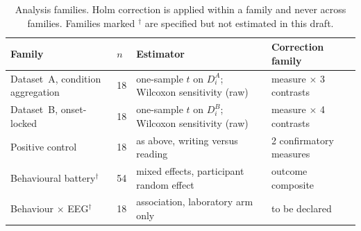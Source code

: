 \documentclass[english]{article}
\begin{document}
\begin{table}[H]
\centering
\footnotesize
\caption{Analysis families. Holm correction is applied within a family and never across families.
Families marked \(^{\dagger}\) are specified but not estimated in this draft.}
\label{tab:analysis-families}
\setlength{\tabcolsep}{5pt}
\begin{tabular}{@{}llll@{}}
\toprule
Family & \(n\) & Estimator & Correction family \\
\midrule
Dataset~A, condition aggregation & 18 & one-sample \(t\) on \(D^{A}_{i}\); Wilcoxon sensitivity (raw) & measure \(\times\) 3 contrasts \\
Dataset~B, onset-locked & 18 & one-sample \(t\) on \(D^{B}_{i}\); Wilcoxon sensitivity (raw) & measure \(\times\) 4 contrasts \\
Positive control & 18 & as above, writing versus reading & 2 confirmatory measures \\
Behavioural battery\(^{\dagger}\) & 54 & mixed effects, participant random effect & outcome composite \\
Behaviour \(\times\) EEG\(^{\dagger}\) & 18 & association, laboratory arm only & to be declared \\
\bottomrule
\end{tabular}
\end{table}
\end{document}
